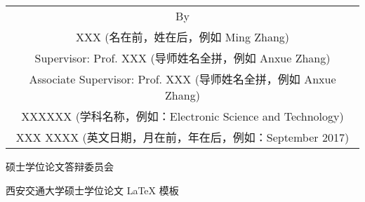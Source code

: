 \begin{titlepage}
\begin{center}
		\vspace{3cm}
		{\sanhao
			\begin{center} \renewcommand{\arraystretch}{1.5}
				\begin{tabular}{c}
					By \\
					XXX (名在前，姓在后，例如 Ming Zhang) \\
					Supervisor: Prof. XXX (导师姓名全拼，例如 Anxue Zhang) \\
					Associate Supervisor: Prof. XXX (导师姓名全拼，例如 Anxue Zhang) \\
					XXXXXX (学科名称，例如：Electronic Science and Technology) \\
					XXX XXXX (英文日期，月在前，年在后，例如：September 2017) \\
				\end{tabular} \renewcommand{\arraystretch}{1}
			\end{center} 
		}
	\end{center}
	\clearpage{\pagestyle{empty}\cleardoublepage}
	
	\newpage\thispagestyle{empty}
	\begin{center}
		\parbox[t][0.7cm][t]{\textwidth}{}
		
		\begin{center}{\hei 硕士学位论文答辩委员会}\end{center}
		
		\vspace{1cm}
		\begin{center}{\hei 西安交通大学硕士学位论文 \LaTeX{} 模板}\end{center}
		

\end{center}
\end{titlepage}
